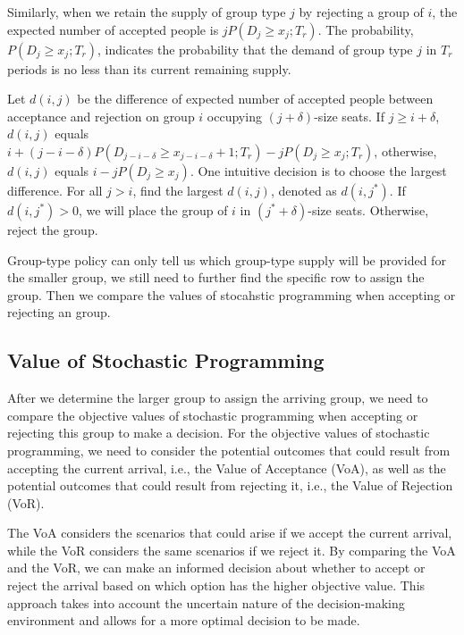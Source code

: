 Similarly, when we retain the supply of group type $j$ by rejecting a group of $i$, the expected number of accepted people is $j P(D_{j} \geq x_{j}; T_r)$. The probability, $P(D_{j} \geq x_{j}; T_r)$, indicates the probability that the demand of group type $j$ in $T_r$ periods is no less than its current remaining supply.

Let $d(i,j)$ be the difference of expected number of accepted people between acceptance and rejection on group $i$ occupying $(j+\delta)$-size seats. If $j \geq i+\delta$, $d(i,j)$ equals $i + (j-i-\delta)P(D_{j-i-\delta} \geq x_{j-i-\delta}+1; T_r) - j P(D_{j} \geq x_{j}; T_r)$, otherwise, $d(i,j)$ equals $i - j P(D_{j} \geq x_{j})$. One intuitive decision is to choose the largest difference. For all $j >i$, find the largest $d(i,j)$, denoted as $d(i,j^{*})$. If $d(i,j^{*}) >0$, we will place the group of $i$ in $(j^{*}+\delta)$-size seats. Otherwise, reject the group.

Group-type policy can only tell us which group-type supply will be provided for the smaller group, we still need to further find the specific row to assign the group. Then we compare the values of stocahstic programming when accepting or rejecting an group.




\subsection{Value of Stochastic Programming}
After we determine the larger group to assign the arriving group, we need to compare the objective values of stochastic programming when accepting or rejecting this group to make a decision. For the objective values of stochastic programming, we need to consider the potential outcomes that could result from accepting the current arrival, i.e., the Value of Acceptance (VoA), as well as the potential outcomes that could result from rejecting it, i.e., the Value of Rejection (VoR).

The VoA considers the scenarios that could arise if we accept the current arrival, while the VoR considers the same scenarios if we reject it. By comparing the VoA and the VoR, we can make an informed decision about whether to accept or reject the arrival based on which option has the higher objective value. This approach takes into account the uncertain nature of the decision-making environment and allows for a more optimal decision to be made. 

